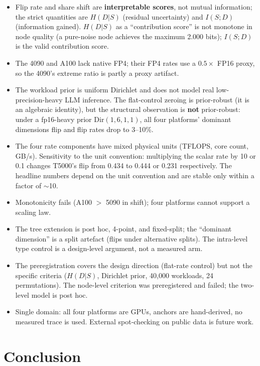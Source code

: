 \documentclass[10pt]{article}
\providecommand{\tightlist}{\relax}
\begin{document}
\begin{itemize}
\tightlist
\item
  Flip rate and share shift are \textbf{interpretable scores}, not mutual information; the strict quantities are $H(D|S)$ (residual uncertainty) and $I(S;D)$ (information gained). $H(D|S)$ as a ``contribution score'' is not monotone in node quality (a pure-noise node achieves the maximum 2.000 bits); $I(S;D)$ is the valid contribution score.
\item
  The 4090 and A100 lack native FP4; their FP4 rates use a $0.5\times$ FP16 proxy, so the 4090's extreme ratio is partly a proxy artifact.
\item
  The workload prior is uniform Dirichlet and does not model real low-precision-heavy LLM inference. The flat-control zeroing is prior-robust (it is an algebraic identity), but the structural observation is \textbf{not} prior-robust: under a fp16-heavy prior $\mathrm{Dir}(1,6,1,1)$, all four platforms' dominant dimensions flip and flip rates drop to 3--10\%.
\item
  The four rate components have mixed physical units (TFLOPS, core count, GB/s). Sensitivity to the unit convention: multiplying the scalar rate by 10 or 0.1 changes T5000's flip from 0.434 to 0.444 or 0.231 respectively. The headline numbers depend on the unit convention and are stable only within a factor of $\sim$10.
\item
  Monotonicity fails (A100 $>$ 5090 in shift); four platforms cannot support a scaling law.
\item
  The tree extension is post hoc, 4-point, and fixed-split; the ``dominant dimension'' is a split artefact (flips under alternative splits). The intra-level type control is a design-level argument, not a measured arm.
\item
  The preregistration covers the design direction (flat-rate control) but not the specific criteria ($H(D|S)$, Dirichlet prior, 40,000 workloads, 24 permutations). The node-level criterion was preregistered and failed; the two-level model is post hoc.
\item
  Single domain: all four platforms are GPUs, anchors are hand-derived, no measured trace is used. External spot-checking on public data is future work.
\end{itemize}

\section{Conclusion}\label{conclusion}
\end{document}
